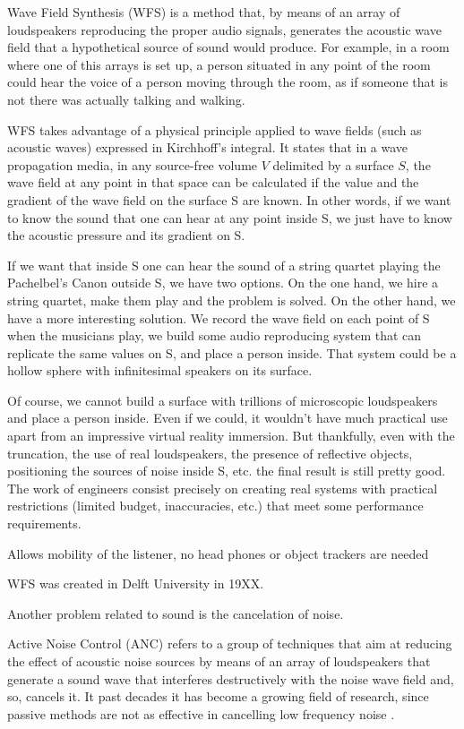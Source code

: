 Wave Field Synthesis (WFS) is a method that, by means of an array of loudspeakers reproducing the proper audio signals, generates the acoustic wave field that a hypothetical source of sound would produce. For example, in a room where one of this arrays is set up, a person situated in any point of the room could hear the voice of a person moving through the room, as if someone that is not there was actually talking and walking.

WFS takes advantage of a physical principle applied to wave fields (such as acoustic waves) expressed in Kirchhoff's integral. It states that in a wave propagation media, in any source-free volume $V$ delimited by a surface $S$, the wave field at any point in that space can be calculated if the value and the gradient of the wave field on the surface S are known. In other words, if we want to know the sound that one can hear at any point inside S, we just have to know the acoustic pressure and its gradient on S.

If we want that inside S one can hear the sound of a string quartet playing the Pachelbel's Canon outside S, we have two options. On the one hand, we hire a string quartet, make them play and the problem is solved. On the other hand, we have a more interesting solution. We record the wave field on each point of S when the musicians play, we build some audio reproducing system that can replicate the same values on S, and place a person inside. That system could be a hollow sphere with infinitesimal speakers on its surface.

Of course, we cannot build a surface with trillions of microscopic loudspeakers and place a person inside. Even if we could, it wouldn't have much practical use apart from an impressive virtual reality immersion. But thankfully, even with the truncation, the use of real loudspeakers, the presence of reflective objects, positioning the sources of noise inside S, etc. the final result is still pretty good. The work of engineers consist precisely on creating real systems with practical restrictions (limited budget, inaccuracies, etc.) that meet some performance requirements.

Allows mobility of the listener, no head phones or object trackers are needed \cite{Kuntz2004}

WFS was created in Delft University in 19XX.

Another problem related to sound is the cancelation of noise. 

Active Noise Control (ANC) refers to a group of techniques that aim at reducing the effect of acoustic noise sources by means of an array of loudspeakers that generate a sound wave that interferes destructively with the noise wave field and, so, cancels it. It past decades it has become a growing field of research, since passive methods are not as effective in cancelling low frequency noise \cite{Lapini2016}.

